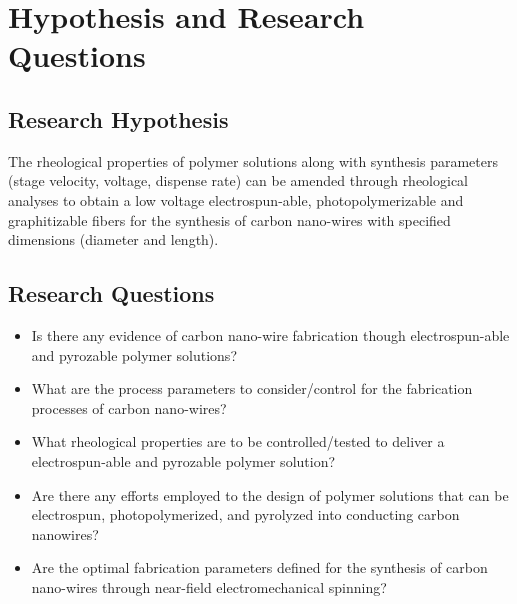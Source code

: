 
\chapter{Hypothesis and Research Questions} %

\label{Chapter:HypothesisandResearchQuestions}


\section{Research Hypothesis}

The rheological properties of polymer solutions along with synthesis parameters (stage velocity, voltage, dispense rate) can be amended through rheological analyses to obtain a low voltage electrospun-able, photopolymerizable and graphitizable fibers for the synthesis of carbon nano-wires with specified dimensions (diameter and length).

\section{Research Questions}

\begin{itemize}
	\item{
	Is there any evidence of carbon nano-wire fabrication though electrospun-able and pyrozable polymer solutions?
	}
	\item{
	What are the process parameters to consider/control for the fabrication processes of carbon nano-wires? 
	}
	\item{
	What rheological properties are to be controlled/tested to deliver a electrospun-able and pyrozable polymer solution?	
	}
	\item{
	Are there any efforts employed to the design of polymer solutions that can be electrospun, photopolymerized, and pyrolyzed into conducting carbon nanowires?
	}
	\item{
	Are the optimal fabrication parameters defined \cite{Cardenas2017} for the synthesis of carbon nano-wires through near-field electromechanical spinning?	
	}
\end{itemize}





